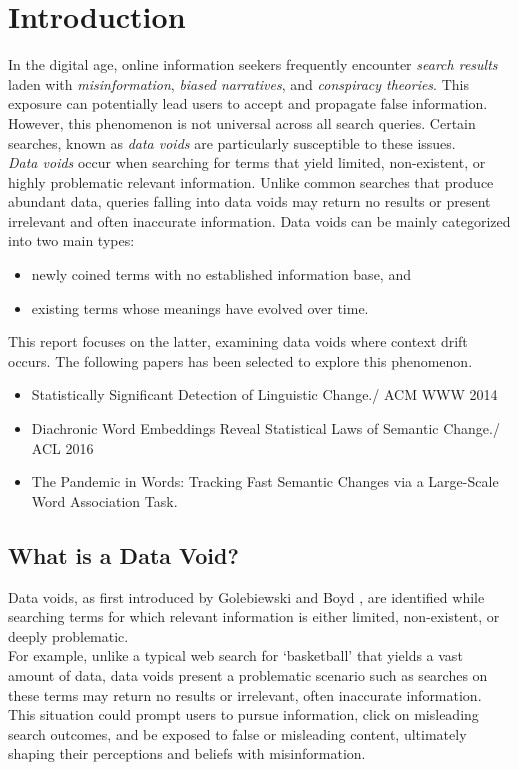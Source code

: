 
\section{Introduction} \label{sec:introduction}
In the digital age, online information seekers frequently encounter \emph{search results} laden with \emph{misinformation}, \emph{biased narratives}, and \emph{conspiracy theories}.
This exposure can potentially lead users to accept and propagate false information.
However, this phenomenon is not universal across all search queries.
Certain searches, known as \textit{data voids} are particularly susceptible to these issues.
\\
\textit{Data voids} occur when searching for terms that yield limited, non-existent, or highly problematic relevant information.
Unlike common searches that produce abundant data, queries falling into data voids may return no results or present irrelevant and often inaccurate information.
Data voids can be mainly categorized into two main types:
\begin{itemize}
    \item newly coined terms with no established information base, and
    \item existing terms whose meanings have evolved over time.
\end{itemize}
This report focuses on the latter, examining data voids where context drift occurs.
The following papers has been selected to explore this phenomenon.
\begin{itemize}
    \item Statistically Significant Detection of Linguistic Change./ ACM WWW 2014 ~\cite{kulkarni2014statisticallysignificantdetectionlinguistic}
    \item Diachronic Word Embeddings Reveal Statistical Laws of Semantic Change./ ACL 2016 ~\cite{hamilton-etal-2016-diachronic}
    \item The Pandemic in Words: Tracking Fast Semantic Changes via a Large-Scale Word Association Task. \cite{10.1162/opmi_a_00081}
\end{itemize}

\subsection{What is a Data Void?}\label{subsec:what-is-a-data-void?}
Data voids, as first introduced by Golebiewski and Boyd \cite{unknown},
are identified while searching terms for which relevant information is either limited, non-existent, or deeply problematic.
\\
For example, unlike a typical web search for `basketball' that yields a vast amount of data,
data voids present a problematic scenario such as searches on these terms may return no results or irrelevant, often inaccurate information.
This situation could prompt users to pursue information, click on misleading search outcomes, and be exposed to false or misleading content,
ultimately shaping their perceptions and beliefs with misinformation.


